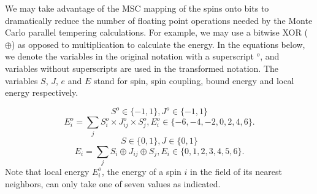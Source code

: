 \label{section_compute}

We may take advantage of the MSC mapping of the spins onto bits to
dramatically reduce the number of floating point operations needed by
the Monte Carlo parallel tempering calculations.  
For example, we may use a bitwise XOR ($\oplus$) as
opposed to multiplication to calculate the energy. In the equations
below, we denote the variables in the original notation with a
superscript $^o$, and variables without superscripts are used in the
transformed notation. The variables $S$,
$J$, $e$ and $E$ stand for
spin, spin coupling, bound energy and local energy respectively.



\[
S^o \in \{-1, 1\}, J^o \in \{-1, 1\}
\]
\[
E^o_{i} = \sum_{j} S^o_i \times J^o_{ij} \times S^o_j, E^o_{i} \in \{-6, -4, -2, 0, 2, 4, 6\}.
\]
\[
S \in \{0, 1\}, J \in \{0, 1\}
\]
\[
E_{i} = \sum_{j} S_i \oplus J_{ij} \oplus S_j, E_{i} \in \{0, 1, 2, 3, 4, 5, 6\}.
\]
Note that local energy $E^o_{i} $, the energy of a spin $i$ in the field of its nearest neighbors, can only take 
one of seven values as indicated.  

